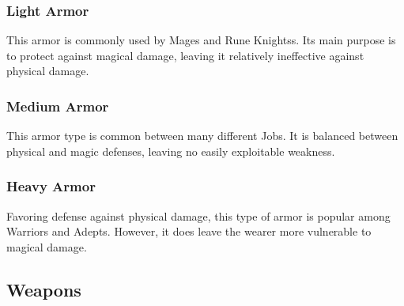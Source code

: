\begin{center}
\end{center}
\clearpage

\subsubsection{Light Armor}

This armor is commonly used by Mages and Rune Knightss. Its main purpose is to protect against magical damage, leaving it relatively ineffective against physical damage.

\begin{tabarm}[label=inv-larm]
    
\end{tabarm}

\clearpage
\subsubsection{Medium Armor}

This armor type is common between many different Jobs.  It is balanced between physical and magic defenses, leaving no easily exploitable weakness.

\begin{tabarm}[label=inv-marm]
    
\end{tabarm}

\clearpage
\subsubsection{Heavy Armor}

Favoring defense against physical damage, this type of armor is popular among Warriors and Adepts.  However, it does leave the wearer more vulnerable to magical damage.

\begin{tabarm}[label=inv-harm]
    
\end{tabarm}

\clearpage
\subsection{Weapons}\label{subsec:inv-weapons}

